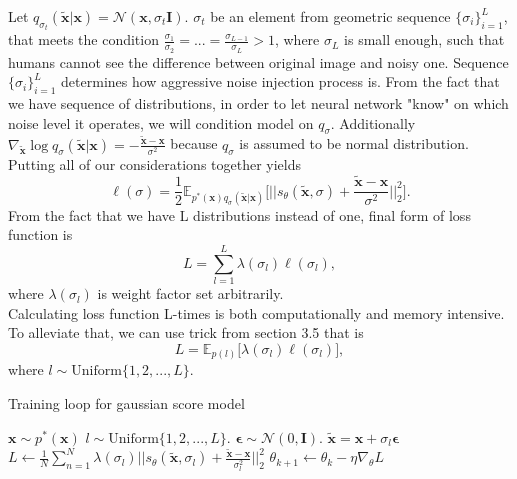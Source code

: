 \documentclass[10pt]{article}
\begin{document}
Let $q_{\sigma_t}(\tilde{\textbf{x}} | \textbf{x}) = \mathcal{N}(\textbf{x}, \sigma_t \mathbf{I})$. $\sigma_t$ be an element from geometric sequence $\{\sigma_i\}_{i = 1}^L$, that meets the condition
$\frac{\sigma_1}{\sigma_2} = ... = \frac{\sigma_{L-1}}{\sigma_L} > 1$, where $\sigma_L$ is small enough, such that humans cannot see the difference between original image and noisy one.
Sequence $\{\sigma_i\}_{i = 1}^L$  determines how aggressive noise injection process is. From the fact that we have sequence of distributions, in order to let neural network "know" on which noise level it operates, we will condition model 
on $q_{\sigma}$. Additionally $\nabla _{\tilde{\textbf{x}}}  \log q_{\sigma}(\tilde{\textbf{x}} | \textbf{x})
= -\frac{\tilde{\textbf{x}} - \textbf{x}}{ \sigma^2}$ because $q_{\sigma}$ is assumed to be normal distribution. Putting all of our considerations together yields
\begin{equation}
    \ell(\sigma) =  \frac{1}{2} \mathbb{E}_{p^*(\textbf{x})q_{\sigma}( \tilde{\textbf{x}} | \textbf{x} )  }
    \Big[ ||  s_{\theta}(\tilde{\textbf{x}}, \sigma)  +
   \frac{\tilde{\textbf{x}} - \textbf{x}}{ \sigma^2} ||_2^2 \Big].
\end{equation}
From the fact that we have L distributions instead of one, final form of loss function is 
\begin{equation}
    L = \sum_{l=1}^L \lambda(\sigma_l) \ell(\sigma_l),
\end{equation}
where $\lambda(\sigma_l)$ is weight factor set arbitrarily. \\
Calculating loss function L-times is both computationally and memory intensive. To alleviate that, we can use trick from section 3.5 that is
\begin{equation}
    L = \mathbb{E}_{p(l)} \Big[ \lambda(\sigma_l) \ell(\sigma_l) \Big],
\end{equation}
where $l \sim \text{Uniform} \{1, 2, ..., L \}$.
\begin{algorithm} [H]
\caption{Training loop for gaussian score model}\label{alg:cap}
\begin{algorithmic}
    \State $\textbf{x} \sim p^*(\textbf{x})$
    \State $l \sim \text{Uniform}\{1, 2, ... , L\}$.
    \State $\bm{\epsilon} \sim \mathcal{N}(0, \mathbf{I})$.
    \State $ \tilde{\textbf{x}} = \textbf{x} + \sigma_l \bm{\epsilon}$
    \State $L \gets \frac{1}{N} \sum_{n=1}^N  \lambda(\sigma_l)
    ||  s_{\theta}(\tilde{\textbf{x}}, \sigma_l)  +
   \frac{\tilde{\textbf{x}} - \textbf{x}}{ \sigma_l^2} ||_2^2 $
    \State $\theta_{k+1} \gets \theta_{k} - \eta \nabla_{\theta}L$
    \EndWhile
\end{algorithmic}
\end{algorithm}
\end{document}
